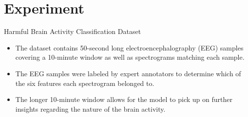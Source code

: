 \documentclass[leqno]{beamer}
\newcommand{\EE}{{\mathbb{E}}}
\newcommand{\PP}{{\mathbb{P}}}
\newcommand{\QQ}{{\mathbb{Q}}}
\newcommand{\Fb}{\mathbf{F}}
\newcommand{\Ib}{\mathbf{I}}
\newcommand{\hb}{\mathbf{h}}
\newcommand{\xb}{\mathbf{x}}
\newcommand{\one}{\mathbbm{1}}
\begin{document}


\section[Experiment]{Experiment}


\begin{frame}{Harmful Brain Activity Classification Dataset}
\begin{itemize}
\item The dataset contains 50-second long electroencephalography (EEG) samples
covering a 10-minute window as well as spectrograms matching each sample.
\bigskip
\item The EEG samples were labeled by expert annotators to determine which of
the six features each spectrogram belonged to.
\bigskip
\item The longer 10-minute window allows for the model to pick up on further
insights regarding the nature of the brain activity.
\end{itemize}
\end{frame}
\end{document}
